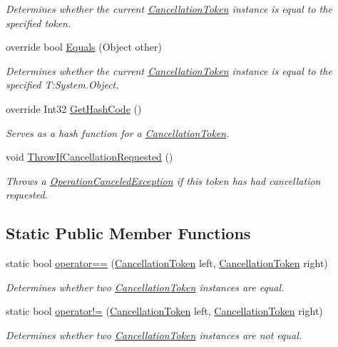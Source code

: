 \begin{DoxyCompactItemize}
\begin{DoxyCompactList}\small\item\em Determines whether the current \hyperlink{}{Cancellation\+Token} instance is equal to the specified token. \end{DoxyCompactList}\item 
override bool \hyperlink{struct_system_1_1_threading_1_1_cancellation_token_a4ceccecd3848e694f1b5e4d7d8c60002}{Equals} (Object other)
\begin{DoxyCompactList}\small\item\em Determines whether the current \hyperlink{}{Cancellation\+Token} instance is equal to the specified T\+:\+System.\+Object. \end{DoxyCompactList}\item 
override Int32 \hyperlink{struct_system_1_1_threading_1_1_cancellation_token_ae540b6a9c1fa9814d58e69a1703fbeef}{Get\+Hash\+Code} ()
\begin{DoxyCompactList}\small\item\em Serves as a hash function for a \hyperlink{}{Cancellation\+Token}. \end{DoxyCompactList}\item 
void \hyperlink{struct_system_1_1_threading_1_1_cancellation_token_ab98969cae74910bdbdde565b167c5499}{Throw\+If\+Cancellation\+Requested} ()
\begin{DoxyCompactList}\small\item\em Throws a \hyperlink{}{Operation\+Canceled\+Exception} if this token has had cancellation requested. \end{DoxyCompactList}\end{DoxyCompactItemize}
\subsection*{Static Public Member Functions}
\begin{DoxyCompactItemize}
\item 
static bool \hyperlink{struct_system_1_1_threading_1_1_cancellation_token_aeae5dad6fee04e98d7bf306b08c365fd}{operator==} (\hyperlink{struct_system_1_1_threading_1_1_cancellation_token}{Cancellation\+Token} left, \hyperlink{struct_system_1_1_threading_1_1_cancellation_token}{Cancellation\+Token} right)
\begin{DoxyCompactList}\small\item\em Determines whether two \hyperlink{}{Cancellation\+Token} instances are equal. \end{DoxyCompactList}\item 
static bool \hyperlink{struct_system_1_1_threading_1_1_cancellation_token_a091d6753aa02ca1f255a7b7e919be086}{operator!=} (\hyperlink{struct_system_1_1_threading_1_1_cancellation_token}{Cancellation\+Token} left, \hyperlink{struct_system_1_1_threading_1_1_cancellation_token}{Cancellation\+Token} right)
\begin{DoxyCompactList}\small\item\em Determines whether two \hyperlink{}{Cancellation\+Token} instances are not equal. \end{DoxyCompactList}\end{DoxyCompactItemize}
